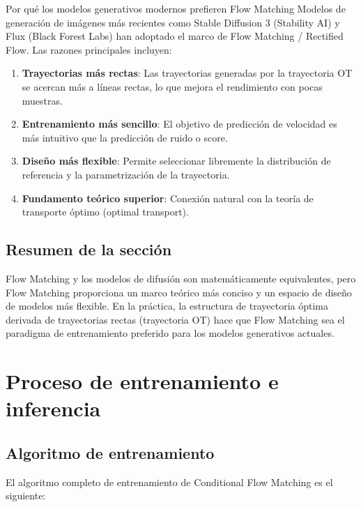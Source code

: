 \documentclass[a4paper]{article}
\begin{document}
\begin{knowledgebox}{Por qué los modelos generativos modernos prefieren Flow Matching}
Modelos de generación de imágenes más recientes como Stable Diffusion 3 (Stability AI) y Flux (Black Forest Labs) han adoptado el marco de Flow Matching / Rectified Flow. Las razones principales incluyen:
\begin{enumerate}
    \item \textbf{Trayectorias más rectas}: Las trayectorias generadas por la trayectoria OT se acercan más a líneas rectas, lo que mejora el rendimiento con pocas muestras.
    \item \textbf{Entrenamiento más sencillo}: El objetivo de predicción de velocidad es más intuitivo que la predicción de ruido o score.
    \item \textbf{Diseño más flexible}: Permite seleccionar libremente la distribución de referencia y la parametrización de la trayectoria.
    \item \textbf{Fundamento teórico superior}: Conexión natural con la teoría de transporte óptimo (optimal transport).
\end{enumerate}
\end{knowledgebox}

\subsection{Resumen de la sección}

Flow Matching y los modelos de difusión son matemáticamente equivalentes, pero Flow Matching proporciona un marco teórico más conciso y un espacio de diseño de modelos más flexible. En la práctica, la estructura de trayectoria óptima derivada de trayectorias rectas (trayectoria OT) hace que Flow Matching sea el paradigma de entrenamiento preferido para los modelos generativos actuales.
\section{Proceso de entrenamiento e inferencia}

\subsection{Algoritmo de entrenamiento}

El algoritmo completo de entrenamiento de Conditional Flow Matching es el siguiente:
\end{document}
